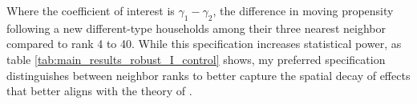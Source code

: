 \documentclass[../main.tex]{subfiles}
\begin{document}
Where the coefficient of interest is $\gamma_1-\gamma_2$, the difference in moving propensity following a new different-type households among their three nearest neighbor compared to rank 4 to 40. While this specification increases statistical power, as table \ref{tab:main_results_robust_I_control} shows, my preferred specification distinguishes between neighbor ranks to better capture the spatial decay of effects that better aligns with the theory of \textcite{schelling1971dynamic}.

\end{document}

